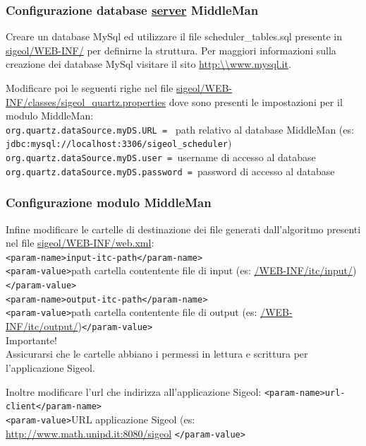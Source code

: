 \documentclass[11pt,a4paper]{article}
\begin{document}
\subsubsection{Configurazione database \underline{server} MiddleMan}

Creare un database MySql ed utilizzare il file scheduler\_tables.sql presente in \url{sigeol/WEB-INF/} per definirne la struttura. 
Per maggiori informazioni sulla creazione dei database MySql visitare il sito \url{http:\\www.mysql.it}.   

Modificare poi le seguenti righe nel file \url{sigeol/WEB-INF/classes/sigeol_quartz.properties} dove sono presenti le impostazioni per il modulo MiddleMan:\\
\verb|org.quartz.dataSource.myDS.URL = | path relativo al database MiddleMan (es: \verb|jdbc:mysql://localhost:3306/sigeol_scheduler|)\\
\verb|org.quartz.dataSource.myDS.user = |username di accesso al database\\
\verb|org.quartz.dataSource.myDS.password = |password di accesso al database\\


\subsubsection{Configurazione modulo MiddleMan}
Infine modificare le cartelle di destinazione dei file generati dall'algoritmo presenti nel file \url{sigeol/WEB-INF/web.xml}:\\
\verb|<param-name>input-itc-path</param-name>|\\
\verb|<param-value>|path cartella contentente file di input (es: \url{/WEB-INF/itc/input/})\verb|</param-value>|\\
\verb|<param-name>output-itc-path</param-name>|\\
\verb|<param-value>|path cartella contentente file di output (es: \url{/WEB-INF/itc/output/})\verb|</param-value>|\\
Importante!\\
Assicurarsi che le cartelle abbiano i permessi in lettura e scrittura per l'applicazione Sigeol.

Inoltre modificare l'url che indirizza all'applicazione Sigeol:
\verb|<param-name>url-client</param-name>|\\
\verb|<param-value>|URL applicazione Sigeol (es: \url{http://www.math.unipd.it:8080/sigeol} \verb|</param-value>|\\
\end{document}
